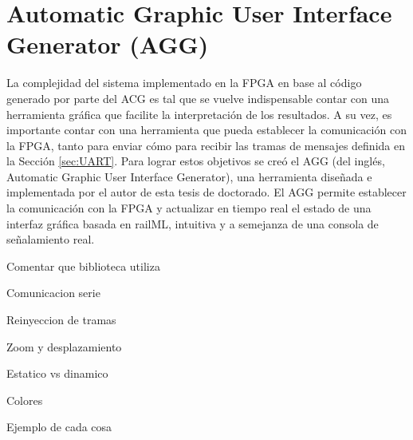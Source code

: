 \chapter{Automatic Graphic User Interface Generator (AGG)}
	\label{sec:AGG}
	
	La complejidad del sistema implementado en la FPGA en base al código generado por parte del ACG es tal que se vuelve indispensable contar con una herramienta gráfica que facilite la interpretación de los resultados. A su vez, es importante contar con una herramienta que pueda establecer la comunicación con la FPGA, tanto para enviar cómo para recibir las tramas de mensajes definida en la Sección \ref{sec:UART}. Para lograr estos objetivos se creó el AGG (del inglés, Automatic Graphic User Interface Generator), una herramienta diseñada e implementada por el autor de esta tesis de doctorado. El AGG permite establecer la comunicación con la FPGA y actualizar en tiempo real el estado de una interfaz gráfica basada en railML, intuitiva y a semejanza de una consola de señalamiento real.
	
	
	
	
	Comentar que biblioteca utiliza
	
	Comunicacion serie
	
	Reinyeccion de tramas
	
	Zoom y desplazamiento
	
	Estatico vs dinamico
	
	Colores
	
	Ejemplo de cada cosa	
	
		
	
	
